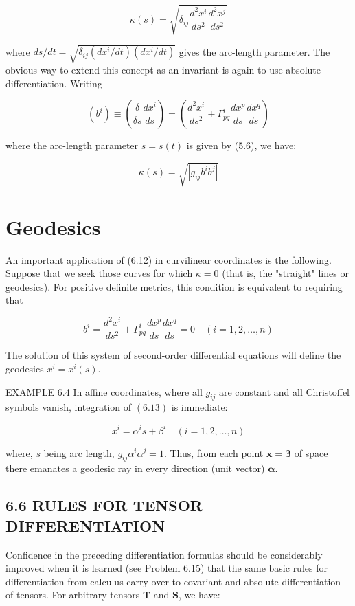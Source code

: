 \documentclass[10pt]{article}
\begin{document}
$$
\kappa(s)=\sqrt{\delta_{i j} \frac{d^{2} x^{i}}{d s^{2}} \frac{d^{2} x^{j}}{d s^{2}}}
$$

where $d s / d t=\sqrt{\delta_{i j}\left(d x^{i} / d t\right)\left(d x^{i} / d t\right)}$ gives the arc-length parameter. The obvious way to extend this concept as an invariant is again to use absolute differentiation. Writing


\begin{equation*}
\left(b^{i}\right) \equiv\left(\frac{\delta}{\delta s} \frac{d x^{i}}{d s}\right)=\left(\frac{d^{2} x^{i}}{d s^{2}}+\Gamma_{p q}^{i} \frac{d x^{p}}{d s} \frac{d x^{q}}{d s}\right) \tag{6.11}
\end{equation*}


where the arc-length parameter $s=s(t)$ is given by (5.6), we have:


\begin{equation*}
\kappa(s)=\sqrt{\left|g_{i j} b^{i} b^{j}\right|} \tag{6.12}
\end{equation*}


\section*{Geodesics}
An important application of (6.12) in curvilinear coordinates is the following. Suppose that we seek those curves for which $\kappa=0$ (that is, the "straight" lines or geodesics). For positive definite metrics, this condition is equivalent to requiring that


\begin{equation*}
b^{i}=\frac{d^{2} x^{i}}{d s^{2}}+\Gamma_{p q}^{i} \frac{d x^{p}}{d s} \frac{d x^{q}}{d s}=0 \quad(i=1,2, \ldots, n) \tag{6.13}
\end{equation*}


The solution of this system of second-order differential equations will define the geodesics $x^{i}=x^{i}(s)$.

EXAMPLE 6.4 In affine coordinates, where all $g_{i j}$ are constant and all Christoffel symbols vanish, integration of $(6.13)$ is immediate:

$$
x^{i}=\alpha^{i} s+\beta^{i} \quad(i=1,2, \ldots, n)
$$

where, $s$ being arc length, $g_{i j} \alpha^{i} \alpha^{j}=1$. Thus, from each point $\mathbf{x}=\boldsymbol{\beta}$ of space there emanates a geodesic ray in every direction (unit vector) $\boldsymbol{\alpha}$.

\subsection*{6.6 RULES FOR TENSOR DIFFERENTIATION}
Confidence in the preceding differentiation formulas should be considerably improved when it is learned (see Problem 6.15) that the same basic rules for differentiation from calculus carry over to covariant and absolute differentiation of tensors. For arbitrary tensors $\mathbf{T}$ and $\mathbf{S}$, we have:
\end{document}
